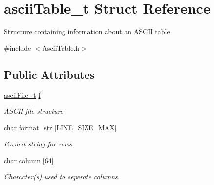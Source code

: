 \hypertarget{structasciiTable__t}{}\section{ascii\+Table\+\_\+t Struct Reference}
\label{structasciiTable__t}


Structure containing information about an A\+S\+C\+II table.  




{\ttfamily \#include $<$Ascii\+Table.\+h$>$}

\subsection*{Public Attributes}
\begin{DoxyCompactItemize}
\item 
\mbox{\label{structasciiTable__t_a1e211c26164429dca7a616e6a8af64a6}} 
\mbox{\hyperlink{structasciiFile__t}{ascii\+File\+\_\+t}} \mbox{\hyperlink{structasciiTable__t_a1e211c26164429dca7a616e6a8af64a6}{f}}
\begin{DoxyCompactList}\small\item\em A\+S\+C\+II file structure. \end{DoxyCompactList}\item 
\mbox{\label{structasciiTable__t_a030a09e49d0cb900ae0e3f6103229d14}} 
char \mbox{\hyperlink{structasciiTable__t_a030a09e49d0cb900ae0e3f6103229d14}{format\+\_\+str}} \mbox{[}L\+I\+N\+E\+\_\+\+S\+I\+Z\+E\+\_\+\+M\+AX\mbox{]}
\begin{DoxyCompactList}\small\item\em Format string for rows. \end{DoxyCompactList}\item 
\mbox{\label{structasciiTable__t_a4c09956acb7a76e0431d9deb6f27be7e}} 
char \mbox{\hyperlink{structasciiTable__t_a4c09956acb7a76e0431d9deb6f27be7e}{column}} \mbox{[}64\mbox{]}
\begin{DoxyCompactList}\small\item\em Character(s) used to seperate columns. \end{DoxyCompactList}\item 
\mbox{\label{structasciiTable__t_a837095bd2a245987e98f2bdd1fccaa94}} 

\end{DoxyCompactItemize}
